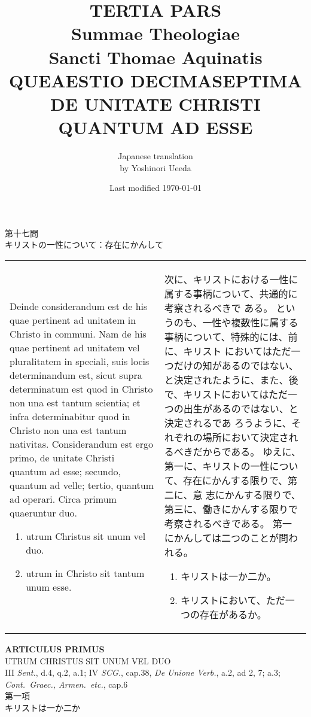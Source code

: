 \documentclass[10pt]{jsarticle} %
\title{{\bf TERTIA PARS}\\{\HUGE Summae Theologiae}\\Sancti Thomae
Aquinatis\\{\sffamily QUEAESTIO DECIMASEPTIMA}\\DE UNITATE CHRISTI QUANTUM AD ESSE}
\author{Japanese translation\\by Yoshinori {\sc Ueeda}}
\date{Last modified \today}
\begin{document}
\maketitle
\pagestyle{fancy}

\begin{center}
{\Large 第十七問\\キリストの一性について：存在にかんして}
\end{center}

\begin{longtable}{p{21em}p{21em}}
Deinde considerandum est de his quae pertinent ad unitatem in Christo in
 communi. Nam de his quae pertinent ad unitatem vel pluralitatem in
 speciali, suis locis determinandum est, sicut supra determinatum est
 quod in Christo non una est tantum scientia; et infra determinabitur
 quod in Christo non una est tantum nativitas. Considerandum est ergo
 primo, de unitate Christi quantum ad esse; secundo, quantum ad velle;
 tertio, quantum ad operari. Circa primum quaeruntur duo. 

\begin{enumerate}
 \item utrum Christus sit unum vel duo.
 \item utrum in Christo sit tantum unum esse.
\end{enumerate}


&

次に、キリストにおける一性に属する事柄について、共通的に考察されるべきで
 ある。
というのも、一性や複数性に属する事柄について、特殊的には、前に、キリスト
 においてはただ一つだけの知があるのではない、と決定されたように、また、後
 で、キリストにおいてはただ一つの出生があるのではない、と決定されるであ
 ろうように、それぞれの場所において決定されるべきだからである。
ゆえに、第一に、キリストの一性について、存在にかんする限りで、第二に、意
 志にかんする限りで、第三に、働きにかんする限りで考察されるべきである。
第一にかんしては二つのことが問われる。

\begin{enumerate}
 \item キリストは一か二か。
 \item キリストにおいて、ただ一つの存在があるか。
\end{enumerate}


\end{longtable}

\newpage



\begin{center}
 {\Large {\bf ARTICULUS PRIMUS}}\\
 {\large UTRUM CHRISTUS SIT UNUM VEL DUO}\\
 {\footnotesize III {\itshape Sent.}, d.4, q.2, a.1; IV {\itshape SCG.},
 cap.38, {\itshape De Unione Verb.}, a.2, ad 2, 7; a.3; {\itshape
 Cont.~Graec., Armen.~etc.}, cap.6}\\
 {\Large 第一項\\キリストは一か二か}
\end{center}
\end{document}
